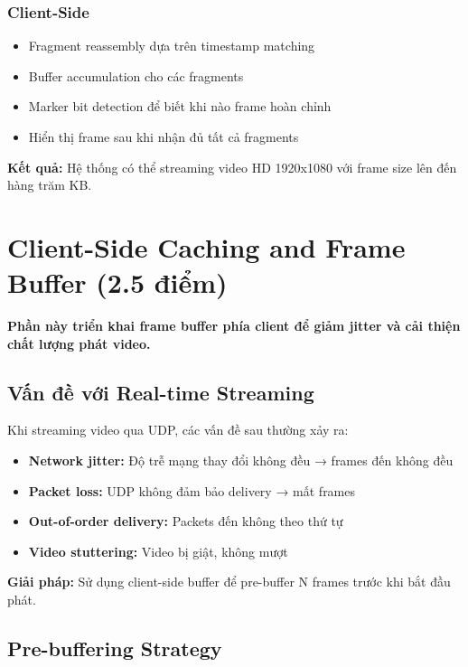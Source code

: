 \documentclass[a4paper,12pt]{article}
\begin{document}
\subsubsection{Client-Side}
\begin{itemize}
    \item Fragment reassembly dựa trên timestamp matching
    \item Buffer accumulation cho các fragments
    \item Marker bit detection để biết khi nào frame hoàn chỉnh
    \item Hiển thị frame sau khi nhận đủ tất cả fragments
\end{itemize}

\textbf{Kết quả:} Hệ thống có thể streaming video HD 1920x1080 với frame size lên đến hàng trăm KB.

\clearpage

\section{Client-Side Caching and Frame Buffer (2.5 điểm)}

\textbf{Phần này triển khai frame buffer phía client để giảm jitter và cải thiện chất lượng phát video.}

\subsection{Vấn đề với Real-time Streaming}

Khi streaming video qua UDP, các vấn đề sau thường xảy ra:
\begin{itemize}
    \item \textbf{Network jitter:} Độ trễ mạng thay đổi không đều → frames đến không đều
    \item \textbf{Packet loss:} UDP không đảm bảo delivery → mất frames
    \item \textbf{Out-of-order delivery:} Packets đến không theo thứ tự
    \item \textbf{Video stuttering:} Video bị giật, không mượt
\end{itemize}

\textbf{Giải pháp:} Sử dụng client-side buffer để pre-buffer N frames trước khi bắt đầu phát.

\subsection{Pre-buffering Strategy}
\end{document}
